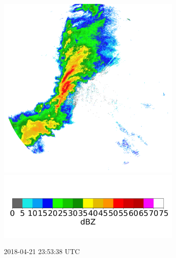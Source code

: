 \begin{figure}[ht]
\begin{subfigure}[b]{0.3\textwidth}
		\includegraphics[width=\textwidth]{./thesis_code/plots/midlothian.tx-20180421-235338-ref.png}
		\includegraphics[width=\textwidth]{./thesis_code/plots/dfw_colormap.png}
		\caption{2018-04-21 23:53:38 UTC}
		\label{fig:bestmodel_translation4}
	\end{subfigure}
	\begin{subfigure}[b]{0.3\textwidth}

\end{subfigure}
\end{figure}
